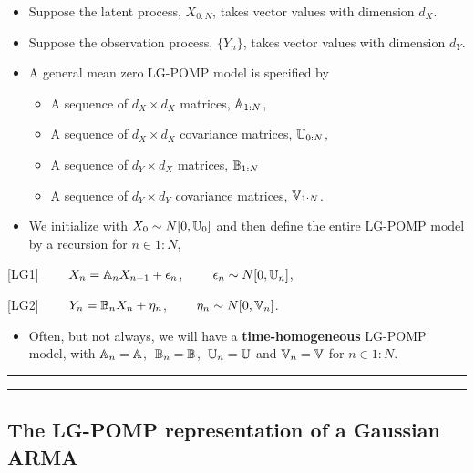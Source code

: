 \documentclass[]{article}
\providecommand{\tightlist}{%
  \setlength{\itemsep}{0pt}\setlength{\parskip}{0pt}}
\begin{document}
\begin{itemize}
\item
  Suppose the latent process, \(X_{0:N}\), takes vector values with
  dimension \(d_X\).
\item
  Suppose the observation process, \(\{Y_n\}\), takes vector values with
  dimension \(d_Y\).
\item
  A general mean zero LG-POMP model is specified by

  \begin{itemize}
  \item
    A sequence of \(d_X\times d_X\) matrices, \(\mathbb{A}_{1:N}\),
  \item
    A sequence of \(d_X\times d_X\) covariance matrices,
    \(\mathbb{U}_{0:N}\),
  \item
    A sequence of \(d_Y\times d_X\) matrices, \(\mathbb{B}_{1:N}\)
  \item
    A sequence of \(d_Y\times d_Y\) covariance matrices,
    \(\mathbb{V}_{1:N}\).
  \end{itemize}
\item
  We initialize with \(X_0\sim N[0,\mathbb{U}_0]\) and then define the
  entire LG-POMP model by a recursion for \(n\in 1:N\),
\end{itemize}

{[}LG1{]} \(\quad\quad X_{n} = \mathbb{A}_n X_{n-1} + \epsilon_n\),
\(\quad\quad \epsilon_n\sim N[0,\mathbb{U}_n]\),

{[}LG2{]} \(\quad\quad Y_{n} = \mathbb{B}_n X_n + \eta_n\),
\(\quad\quad \eta_n\sim N[0,\mathbb{V}_n]\).

\begin{itemize}
\tightlist
\item
  Often, but not always, we will have a \textbf{time-homogeneous}
  LG-POMP model, with \(\mathbb{A}_n=\mathbb{A}\), \(\;\mathbb{B}_n=\mathbb{B}\),
  \(\;\mathbb{U}_n=\mathbb{U}\) and \(\mathbb{V}_n=\mathbb{V}\) for
  \(n\in 1:N\).
\end{itemize}

\begin{center}\rule{0.5\linewidth}{\linethickness}\end{center}

\begin{center}\rule{0.5\linewidth}{\linethickness}\end{center}

\subsection{The LG-POMP representation of a Gaussian
ARMA}\label{the-lg-pomp-representation-of-a-gaussian-arma}
\end{document}
